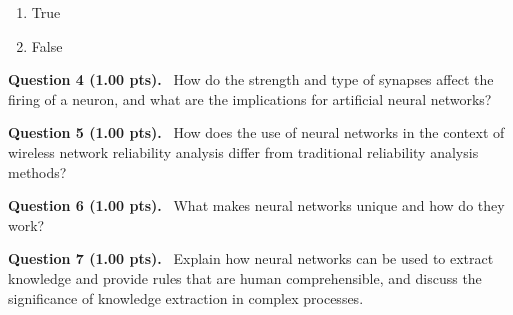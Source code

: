 \documentclass[12pt,a4paper]{article}
\begin{document}
\begin{enumerate}[label=\textbf{\Alph*.}]
  \item True
  \item False
\end{enumerate}



\vspace{0.5em}


\noindent
\textbf{Question 4 (1.00 pts).}~
How do the strength and type of synapses affect the firing of a neuron, and what are the implications for artificial neural networks?


\vspace{0.4cm}
\noindent\makebox[\linewidth]{\hrulefill}
\vspace{0.6cm}



\vspace{0.5em}


\noindent
\textbf{Question 5 (1.00 pts).}~
How does the use of neural networks in the context of wireless network reliability analysis differ from traditional reliability analysis methods?


\vspace{0.4cm}
\noindent\makebox[\linewidth]{\hrulefill}
\vspace{0.6cm}



\vspace{0.5em}


\noindent
\textbf{Question 6 (1.00 pts).}~
What makes neural networks unique and how do they work?


\vspace{0.4cm}
\noindent\makebox[\linewidth]{\hrulefill}
\vspace{0.4cm}
\noindent\makebox[\linewidth]{\hrulefill}
\vspace{0.4cm}
\noindent\makebox[\linewidth]{\hrulefill}
\vspace{0.6cm}



\vspace{0.5em}


\noindent
\textbf{Question 7 (1.00 pts).}~
Explain how neural networks can be used to extract knowledge and provide rules that are human comprehensible, and discuss the significance of knowledge extraction in complex processes.


\vspace{0.4cm}
\noindent\makebox[\linewidth]{\hrulefill}
\vspace{0.4cm}
\noindent\makebox[\linewidth]{\hrulefill}
\vspace{0.4cm}
\noindent\makebox[\linewidth]{\hrulefill}
\vspace{0.6cm}
\end{document}
